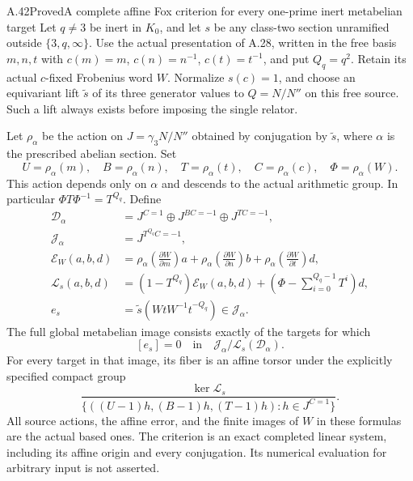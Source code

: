 \begin{statement}{A.42}{Proved}{A complete affine Fox criterion for every one-prime inert metabelian target}
Let $q\ne3$ be inert in $K_0$, and let $s$ be any class-two
section unramified outside $\{3,q,\infty\}$. Use the actual
presentation of A.28, written in the free basis $m,n,t$ with
$c(m)=m$, $c(n)=n^{-1}$, $c(t)=t^{-1}$, and put $Q_q=q^2$.
Retain its actual $c$-fixed Frobenius word $W$. Normalize
$s(c)=1$, and choose an equivariant lift $\widetilde s$ of
its three generator values to $Q=N/N''$ on this free source.
Such a lift always exists before imposing the single relator.

Let $\rho_\alpha$ be the action on $J=\gamma_3N/N''$ obtained
by conjugation by $\widetilde s$, where $\alpha$ is the
prescribed abelian section. Set
\[
 U=\rho_\alpha(m),\quad B=\rho_\alpha(n),\quad
 T=\rho_\alpha(t),\quad C=\rho_\alpha(c),\quad
 \Phi=\rho_\alpha(W).
 \tag{A.42.1}
\]
This action depends only on $\alpha$ and descends to the
actual arithmetic group. In particular
$\Phi T\Phi^{-1}=T^{Q_q}$. Define
\[
\begin{split}
 \mathcal D_\alpha&=
 J^{C=1}\oplus J^{BC=-1}\oplus J^{TC=-1},\\
 \mathcal J_\alpha&=J^{T^{Q_q}C=-1},\\
 \mathcal E_W(a,b,d)&=
 \rho_\alpha\!\left(\frac{\partial W}{\partial m}\right)a+
 \rho_\alpha\!\left(\frac{\partial W}{\partial n}\right)b+
 \rho_\alpha\!\left(\frac{\partial W}{\partial t}\right)d,\\
 \mathcal L_s(a,b,d)&=(1-T^{Q_q})\mathcal E_W(a,b,d)
                +\left(\Phi-\sum_{i=0}^{Q_q-1}T^i\right)d,\\
 e_s&=\widetilde s(WtW^{-1}t^{-Q_q})\in\mathcal J_\alpha.
\end{split}
 \tag{A.42.2}
\]
The full global metabelian image consists exactly of the
targets for which
\[
             [e_s]=0\quad\text{in}\quad
                  \mathcal J_\alpha/\mathcal L_s(\mathcal D_\alpha).
 \tag{A.42.3}
\]
For every target in that image, its fiber is an affine torsor
under the explicitly specified compact group
\[
 \frac{\ker\mathcal L_s}
 {\{((U-1)h,(B-1)h,(T-1)h):h\in J^{C=1}\}}.
 \tag{A.42.4}
\]
All source actions, the affine error, and the finite images of
$W$ in these formulas are the actual based ones. The criterion
is an exact completed linear system, including its affine
origin and every conjugation. Its numerical evaluation for
arbitrary input is not asserted.
\end{statement}
